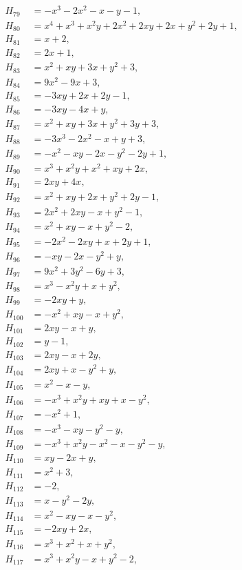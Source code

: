 \documentclass[11pt]{article}
\begin{document}
\begin{align*}
H_{79}&=-x^{3}-2x^{2}-x-y-1,\\
H_{80}&=x^{4}+x^{3}+x^{2}y+2x^{2}+2xy+2x+y^{2}+2y+1,\\
H_{81}&=x+2,\\
H_{82}&=2x+1,\\
H_{83}&=x^{2}+xy+3x+y^{2}+3,\\
H_{84}&=9x^{2}-9x+3,\\
H_{85}&=-3xy+2x+2y-1,\\
H_{86}&=-3xy-4x+y,\\
H_{87}&=x^{2}+xy+3x+y^{2}+3y+3,\\
H_{88}&=-3x^{3}-2x^{2}-x+y+3,\\
H_{89}&=-x^{2}-xy-2x-y^{2}-2y+1,\\
H_{90}&=x^{3}+x^{2}y+x^{2}+xy+2x,\\
H_{91}&=2xy+4x,\\
H_{92}&=x^{2}+xy+2x+y^{2}+2y-1,\\
H_{93}&=2x^{2}+2xy-x+y^{2}-1,\\
H_{94}&=x^{2}+xy-x+y^{2}-2,\\
H_{95}&=-2x^{2}-2xy+x+2y+1,\\
H_{96}&=-xy-2x-y^{2}+y,\\
H_{97}&=9x^{2}+3y^{2}-6y+3,\\
H_{98}&=x^{3}-x^{2}y+x+y^{2},\\
H_{99}&=-2xy+y,\\
H_{100}&=-x^{2}+xy-x+y^{2},\\
H_{101}&=2xy-x+y,\\
H_{102}&=y-1,\\
H_{103}&=2xy-x+2y,\\
H_{104}&=2xy+x-y^{2}+y,\\
H_{105}&=x^{2}-x-y,\\
H_{106}&=-x^{3}+x^{2}y+xy+x-y^{2},\\
H_{107}&=-x^{2}+1,\\
H_{108}&=-x^{3}-xy-y^{2}-y,\\
H_{109}&=-x^{3}+x^{2}y-x^{2}-x-y^{2}-y,\\
H_{110}&=xy-2x+y,\\
H_{111}&=x^{2}+3,\\
H_{112}&=-2,\\
H_{113}&=x-y^{2}-2y,\\
H_{114}&=x^{2}-xy-x-y^{2},\\
H_{115}&=-2xy+2x,\\
H_{116}&=x^{3}+x^{2}+x+y^{2},\\
H_{117}&=x^{3}+x^{2}y-x+y^{2}-2,\\

\end{align*}
\end{document}
